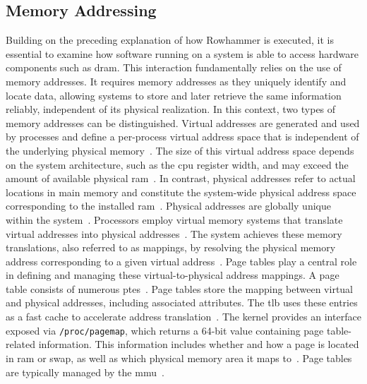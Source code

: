   \subsection{Memory Addressing} \label{subsec:memory-addressing}
    Building on the preceding explanation of how Rowhammer is executed, it is essential to
    examine how software running on a system is able to access hardware components 
    such as \gls{dram}. This interaction fundamentally relies on the use of memory 
    addresses.
    It requires memory addresses as they uniquely identify and locate data, 
    allowing systems to store and later retrieve the same information reliably, 
    independent of its physical realization. In this context, 
    two types of memory addresses can be distinguished.
    Virtual addresses are generated and used by processes and define a per-process 
    virtual address space that is independent of the underlying physical 
    memory~\cite{webVirtualAddress}. The size of this virtual address space depends on the system 
    architecture, such as the \gls{cpu} register width, and may exceed the amount of 
    available physical \gls{ram}~\cite{blogVirtualMemory}. In contrast, physical addresses refer to actual 
    locations in main memory and constitute the system-wide physical address 
    space corresponding to the installed \gls{ram}~\cite{blogVirtToPhys}. Physical addresses are globally 
    unique within the system~\cite{blogVirtualMemory}.
    Processors employ virtual memory systems that translate virtual addresses into 
    physical addresses~\cite{toolRPI3}. The system achieves these memory translations, also 
    referred to as mappings, by resolving the physical memory 
    address corresponding to a given virtual address~\cite{blogVirtToPhys}. Page tables play a 
    central role in defining and managing these virtual-to-physical address mappings.
    A page table consists of numerous \gls{pte}s~\cite{blogVirtToPhys}. Page tables 
    store the mapping between virtual and physical addresses, including associated 
    attributes. The \gls{tlb} uses these entries
    as a fast cache to accelerate address translation~\cite{blogVirtualMemory, docPageTables}.
    The kernel provides an interface exposed via \texttt{/proc/pagemap}, which returns a 
    64-bit value containing page table-related information. This information 
    includes whether and how a page is located in \gls{ram} or swap, as well as which 
    physical memory area it maps to~\cite{docExaminingPageTables}.
    Page tables are typically managed by the \gls{mmu}~\cite{webVirtualMemoryTranslation, blogVirtToPhys}. 

